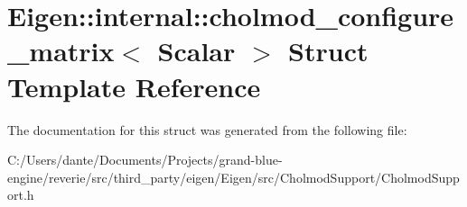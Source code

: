 \hypertarget{struct_eigen_1_1internal_1_1cholmod__configure__matrix}{}\section{Eigen\+::internal\+::cholmod\+\_\+configure\+\_\+matrix$<$ Scalar $>$ Struct Template Reference}
\label{struct_eigen_1_1internal_1_1cholmod__configure__matrix}


The documentation for this struct was generated from the following file\+:\begin{DoxyCompactItemize}
\item 
C\+:/\+Users/dante/\+Documents/\+Projects/grand-\/blue-\/engine/reverie/src/third\+\_\+party/eigen/\+Eigen/src/\+Cholmod\+Support/Cholmod\+Support.\+h\end{DoxyCompactItemize}
